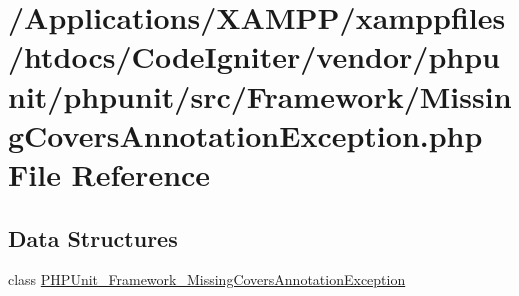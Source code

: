 \hypertarget{phpunit_2src_2_framework_2_missing_covers_annotation_exception_8php}{}\section{/\+Applications/\+X\+A\+M\+P\+P/xamppfiles/htdocs/\+Code\+Igniter/vendor/phpunit/phpunit/src/\+Framework/\+Missing\+Covers\+Annotation\+Exception.php File Reference}
\label{phpunit_2src_2_framework_2_missing_covers_annotation_exception_8php}
\subsection*{Data Structures}
\begin{DoxyCompactItemize}
\item 
class \mbox{\hyperlink{class_p_h_p_unit___framework___missing_covers_annotation_exception}{P\+H\+P\+Unit\+\_\+\+Framework\+\_\+\+Missing\+Covers\+Annotation\+Exception}}
\end{DoxyCompactItemize}
